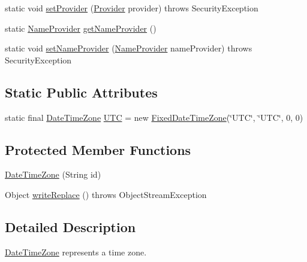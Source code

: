 \begin{DoxyCompactItemize}
static void \hyperlink{classorg_1_1joda_1_1time_1_1_date_time_zone_a310b2d40644519125e034e52449b87cb}{set\-Provider} (\hyperlink{interfaceorg_1_1joda_1_1time_1_1tz_1_1_provider}{Provider} provider)  throws Security\-Exception 
\item 
static \hyperlink{interfaceorg_1_1joda_1_1time_1_1tz_1_1_name_provider}{Name\-Provider} \hyperlink{classorg_1_1joda_1_1time_1_1_date_time_zone_a0cc05939c2e027c57c0be8fc040d4de2}{get\-Name\-Provider} ()
\item 
static void \hyperlink{classorg_1_1joda_1_1time_1_1_date_time_zone_ab6f1c22fcbfac14641c23c855cef5e77}{set\-Name\-Provider} (\hyperlink{interfaceorg_1_1joda_1_1time_1_1tz_1_1_name_provider}{Name\-Provider} name\-Provider)  throws Security\-Exception 
\end{DoxyCompactItemize}
\subsection*{Static Public Attributes}
\begin{DoxyCompactItemize}
\item 
static final \hyperlink{classorg_1_1joda_1_1time_1_1_date_time_zone}{Date\-Time\-Zone} \hyperlink{classorg_1_1joda_1_1time_1_1_date_time_zone_a0354972ef4cfccf4c7d87db7b80f3153}{U\-T\-C} = new \hyperlink{classorg_1_1joda_1_1time_1_1tz_1_1_fixed_date_time_zone}{Fixed\-Date\-Time\-Zone}(\char`\"{}U\-T\-C\char`\"{}, \char`\"{}U\-T\-C\char`\"{}, 0, 0)
\end{DoxyCompactItemize}
\subsection*{Protected Member Functions}
\begin{DoxyCompactItemize}
\item 
\hyperlink{classorg_1_1joda_1_1time_1_1_date_time_zone_a54626c83ddcd8da023dceec088551919}{Date\-Time\-Zone} (String id)
\item 
Object \hyperlink{classorg_1_1joda_1_1time_1_1_date_time_zone_a5f8e476a4f68a893c24b3ddd1b803d46}{write\-Replace} ()  throws Object\-Stream\-Exception 
\end{DoxyCompactItemize}


\subsection{Detailed Description}
\hyperlink{classorg_1_1joda_1_1time_1_1_date_time_zone}{Date\-Time\-Zone} represents a time zone. 

